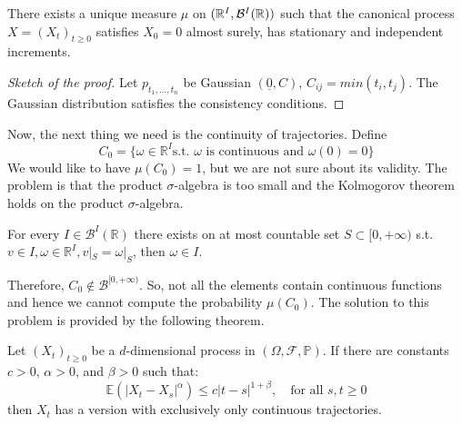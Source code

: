 \begin{PropBox}
    \begin{Cor}
    There exists a unique measure $\mu$ on $(\mathbb{R}^I,\mathcal{B}^I(\mathbb{R}) )$ such that the canonical process $X=(X_t)_{t \geq 0}$ satisfies $X_0=0$ almost surely, has  stationary and independent increments. 
\end{Cor}
\end{PropBox}
\begin{ProofBox}
\begin{proof}[Sketch of the proof]
    Let $p_{t_1, \dots, t_n}$ be Gaussian $(\underline{0}, C)$, $C_{ij}= min(t_i, t_j)$. The Gaussian distribution satisfies the consistency conditions. 
\end{proof}
\end{ProofBox}
Now, the next thing we need is the continuity of trajectories. Define
\begin{equation*}
    C_0=\{\omega \in \mathbb{R}^I \text{s.t. } \omega \text{ is continuous and } \omega(0) = 0\}
\end{equation*}
We would like to have $\mu(C_0) = 1$, but we are not sure about its validity. The problem is that the product $\sigma$-algebra is too small and the Kolmogorov theorem holds on the product $\sigma$-algebra.
\begin{PropBox}
    \begin{Lemma}
    For every $I \in \mathcal{B}^I(\mathbb{R})$ there exists on at most countable set $S \subset [0,+\infty)$ s.t. $v \in I, \omega \in \mathbb{R}^I, v|_S = \omega |_S$, then $\omega \in I$. 
\end{Lemma}
\end{PropBox}
Therefore, $C_0 \notin \mathcal{B}^{[0,+\infty)}$. So, not all the elements contain continuous functions and hence we cannot compute the probability $\mu(C_0)$. The solution to this problem is provided by the following theorem.
\begin{ThBox}
    \begin{Th}
    Let \((X_t)_{t \geq 0}\) be a \(d\)-dimensional process in \((\Omega, \mathcal{F}, \mathbb{P})\). If there are constants \(c > 0\), \(\alpha > 0\), and \(\beta > 0\) such that:
    \begin{equation*}
        \mathbb{E} \left( |X_t - X_s|^\alpha \right) \leq c |t - s|^{1 + \beta}, \quad \text{for all } s, t \geq 0
    \end{equation*}
then \(X_t\) has a version with exclusively only continuous trajectories.
\end{Th}
\end{ThBox}
